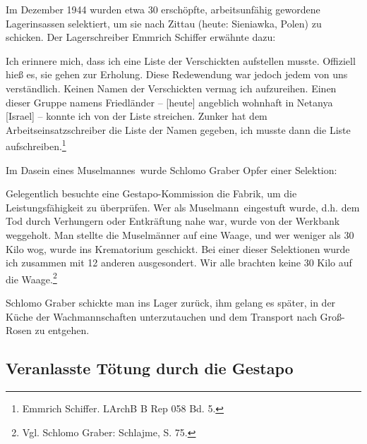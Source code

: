 Im Dezember 1944 wurden etwa 30 erschöpfte, arbeitsunfähig gewordene Lagerinsassen\label{widerstand_schiffer} \glqq selektiert\grqq, um sie nach Zittau (heute: Sieniawka, Polen) zu schicken. Der Lagerschreiber Emmrich Schiffer erwähnte dazu:
\begin{leftbar}
Ich erinnere mich, dass ich eine Liste der Verschickten aufstellen musste. Offiziell hieß es, sie gehen zur Erholung. Diese Redewendung war jedoch jedem von uns verständlich. Keinen Namen der Verschickten vermag ich aufzureihen. Einen dieser Gruppe namens Friedländer -- [heute] angeblich wohnhaft in Netanya [Israel] -- konnte ich von der Liste streichen. Zunker hat dem Arbeitseinsatzschreiber die Liste der Namen gegeben, ich musste dann die Liste aufschreiben.\footnote{Emmrich Schiffer. LArchB B Rep 058 Bd. 5.}
\end{leftbar}

Im Dasein eines \glqq Muselmannes\grqq~wurde Schlomo Graber Opfer einer \glqq Selektion\grqq:
\begin{leftbar}
Gelegentlich besuchte eine Gestapo-Kommission die Fabrik, um die Leistungsfähigkeit zu überprüfen. Wer als \glqq Muselmann\grqq~eingestuft wurde, d.h. dem Tod durch Verhungern oder Entkräftung nahe war, wurde von der Werkbank weggeholt. Man stellte die Muselmänner auf eine Waage, und wer weniger als 30 Kilo wog, wurde ins Krematorium geschickt. Bei einer dieser Selektionen wurde ich zusammen mit 12 anderen ausgesondert. Wir alle brachten keine 30 Kilo auf die Waage.\footnote{Vgl. Schlomo Graber: Schlajme, S. 75.}
\end{leftbar}
Schlomo Graber schickte man ins Lager zurück, ihm gelang es später, in der Küche der Wachmannschaften unterzutauchen und dem Transport nach Groß-Rosen zu entgehen.



\subsection{Veranlasste Tötung durch die Gestapo}


